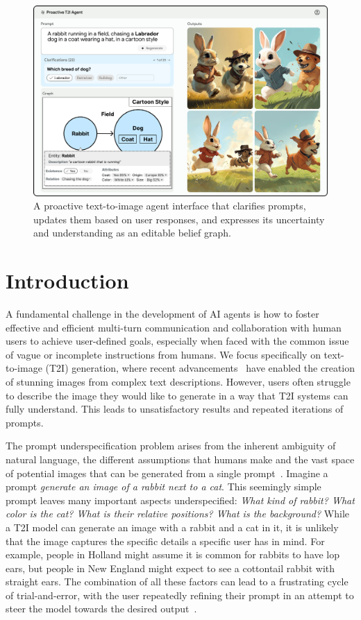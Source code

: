 \begin{figure}[h!]
    \centering
    \includegraphics[width=.95\linewidth]{figures/Fig1.pdf}
    \caption{A proactive text-to-image agent interface that clarifies prompts, updates them based on user responses, and expresses its uncertainty and understanding as an editable belief graph.} %
    \label{fig:first_figure_interface}
\end{figure} 

\section{Introduction}
A fundamental challenge in the development of AI agents is how to foster effective and efficient multi-turn communication and collaboration with human users to achieve user-defined goals, especially when faced with the common issue of vague or incomplete instructions from humans. We focus specifically on text-to-image (T2I) generation, where recent advancements~\citep{imagenteamgoogle2024imagen3, betker2023improving, podell2023sdxl, yu2023scaling} have enabled the creation of stunning images from complex text descriptions. However, users often struggle to describe the image they would like to generate in a way that T2I systems can fully understand. This leads to unsatisfactory results and repeated iterations of prompts. %

The prompt underspecification problem arises from the inherent ambiguity of natural language, the different assumptions that humans make and the vast space of potential images that can be generated from a single prompt~\citep{hutchinson2022underspecificationscenedescriptiontodepictiontasks}. Imagine a prompt \textit{generate an image of a rabbit next to a cat}. This seemingly simple prompt leaves many important aspects underspecified: \textit{What kind of rabbit? What color is the cat? What is their relative positions? What is the background?} While a T2I model can generate an image with a rabbit and a cat in it, it is unlikely that the image captures the specific details a specific user has in mind. For example, people in Holland might assume it is common for rabbits to have lop ears, but people in New England might expect to see a cottontail rabbit with straight ears. The combination of all these factors can lead to a frustrating cycle of trial-and-error, with the user repeatedly refining their prompt in an attempt to steer the model towards the desired output~\citep{vodrahalli2023artwhisperer,huang2024dialoggen, sun2023dsg}. 

